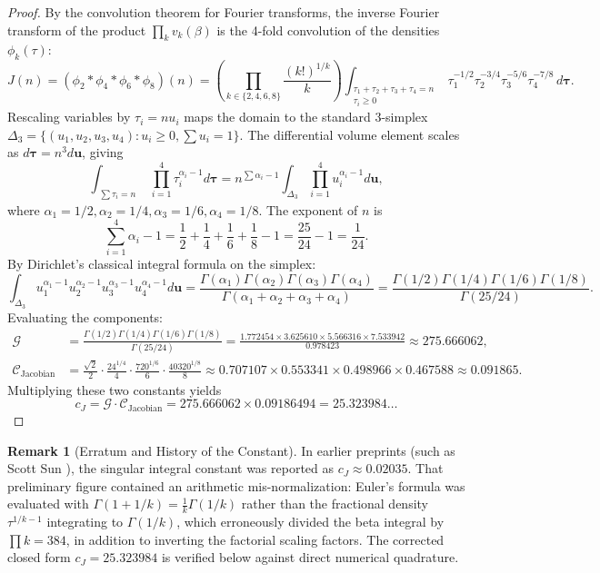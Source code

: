 \documentclass[11pt, a4paper]{article}
\theoremstyle{plain}
\theoremstyle{definition}
\newtheorem{remark}[theorem]{Remark}
\begin{document}
\begin{proof}
By the convolution theorem for Fourier transforms, the inverse Fourier transform of the product $\prod_{k} v_k(\beta)$ is the 4-fold convolution of the densities $\phi_k(\tau)$:
\[
J(n) = (\phi_2 * \phi_4 * \phi_6 * \phi_8)(n) = \left( \prod_{k \in \{2,4,6,8\}} \frac{(k!)^{1/k}}{k} \right) \int_{\substack{\tau_1+\tau_2+\tau_3+\tau_4 = n \\ \tau_i \ge 0}} \tau_1^{-1/2} \tau_2^{-3/4} \tau_3^{-5/6} \tau_4^{-7/8} \, d\boldsymbol{\tau}.
\]
Rescaling variables by $\tau_i = n u_i$ maps the domain to the standard 3-simplex $\Delta_3 = \{(u_1,u_2,u_3,u_4) : u_i \ge 0, \sum u_i = 1\}$. The differential volume element scales as $d\boldsymbol{\tau} = n^3 d\mathbf{u}$, giving
\[
\int_{\substack{\sum \tau_i = n}} \prod_{i=1}^4 \tau_i^{\alpha_i - 1} d\boldsymbol{\tau} = n^{\sum \alpha_i - 1} \int_{\Delta_3} \prod_{i=1}^4 u_i^{\alpha_i - 1} d\mathbf{u},
\]
where $\alpha_1 = 1/2, \alpha_2 = 1/4, \alpha_3 = 1/6, \alpha_4 = 1/8$.
The exponent of $n$ is
\[
\sum_{i=1}^4 \alpha_i - 1 = \frac{1}{2} + \frac{1}{4} + \frac{1}{6} + \frac{1}{8} - 1 = \frac{25}{24} - 1 = \frac{1}{24}.
\]
By Dirichlet's classical integral formula on the simplex:
\[
\int_{\Delta_3} u_1^{\alpha_1 - 1} u_2^{\alpha_2 - 1} u_3^{\alpha_3 - 1} u_4^{\alpha_4 - 1} d\mathbf{u} = \frac{\Gamma(\alpha_1)\Gamma(\alpha_2)\Gamma(\alpha_3)\Gamma(\alpha_4)}{\Gamma(\alpha_1+\alpha_2+\alpha_3+\alpha_4)} = \frac{\Gamma(1/2)\Gamma(1/4)\Gamma(1/6)\Gamma(1/8)}{\Gamma(25/24)}.
\]
Evaluating the components:
\begin{align*}
\mathcal{G} &= \frac{\Gamma(1/2)\Gamma(1/4)\Gamma(1/6)\Gamma(1/8)}{\Gamma(25/24)} = \frac{1.772454 \times 3.625610 \times 5.566316 \times 7.533942}{0.978423} \approx 275.666062,\\
\mathcal{C}_{\text{Jacobian}} &= \frac{\sqrt{2}}{2} \cdot \frac{24^{1/4}}{4} \cdot \frac{720^{1/6}}{6} \cdot \frac{40320^{1/8}}{8} \approx 0.707107 \times 0.553341 \times 0.498966 \times 0.467588 \approx 0.091865.
\end{align*}
Multiplying these two constants yields
\[
c_J = \mathcal{G} \cdot \mathcal{C}_{\text{Jacobian}} = 275.666062 \times 0.09186494 = 25.323984\ldots
\]
\qedhere
\end{proof}

\begin{remark}[Erratum and History of the Constant]
In earlier preprints (such as Scott Sun \cite{scottsun2026v2}), the singular integral constant was reported as $c_J \approx 0.02035$. That preliminary figure contained an arithmetic mis-normalization: Euler's formula was evaluated with $\Gamma(1+1/k) = \frac{1}{k}\Gamma(1/k)$ rather than the fractional density $\tau^{1/k-1}$ integrating to $\Gamma(1/k)$, which erroneously divided the beta integral by $\prod k = 384$, in addition to inverting the factorial scaling factors. The corrected closed form $c_J = 25.323984$ is verified below against direct numerical quadrature.
\end{remark}
\end{document}
